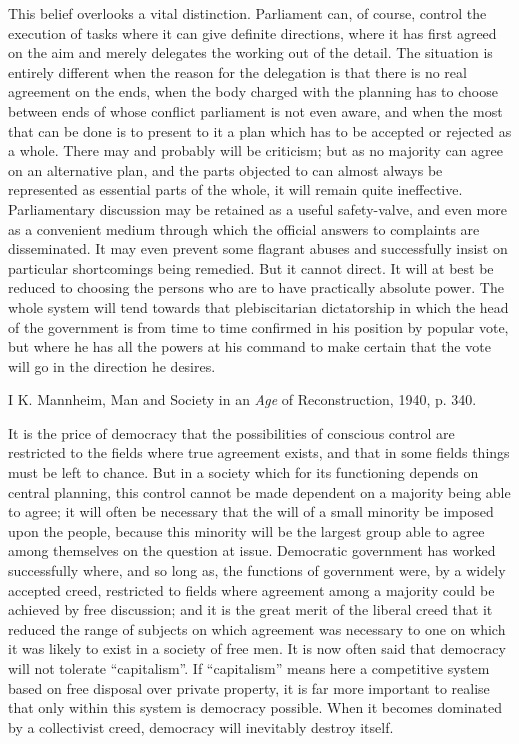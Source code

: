 \documentclass[11pt,openany]{book}
\begin{document}
This belief overlooks a vital distinction. Parliament can, of course, control the execution of tasks where it can give definite directions, where it has first agreed on the aim and merely delegates the working out of the detail. The situation is entirely different when the reason for the delegation is that there is no real agreement on the ends, when the body charged with the planning has to choose between ends of whose conflict parliament is not even aware, and when the most that can be done is to present to it a plan which has to be accepted or rejected as a whole. There may and probably will be criticism; but as no majority can agree on an alternative plan, and the parts objected to can almost always be represented as essential parts of the whole, it will remain quite ineffective. Parliamentary discussion may be retained as a useful safety-valve, and even more as a convenient medium through which the official answers to complaints are disseminated. It may even prevent some flagrant abuses and successfully insist on particular shortcomings being remedied. But it cannot direct. It will at best be reduced to choosing the persons who are to have practically absolute power. The whole system will tend towards that plebiscitarian dictatorship in which the head of the government is from time to time confirmed in his position by popular vote, but where he has all the powers at his command to make certain that the vote will go in the direction he desires.

I K. Mannheim, Man and Society in an \emph{Age} of Reconstruction, 1940, p. 340.

It is the price of democracy that the possibilities of conscious control are restricted to the fields where true agreement exists, and that in some fields things must be left to chance. But in a society which for its functioning depends on central planning, this control cannot be made dependent on a majority being able to agree; it will often be necessary that the will of a small minority be imposed upon the people, because this minority will be the largest group able to agree among themselves on the question at issue. Democratic government has worked successfully where, and so long as, the functions of government were, by a widely accepted creed, restricted to fields where agreement among a majority could be achieved by free discussion; and it is the great merit of the liberal creed that it reduced the range of subjects on which agreement was necessary to one on which it was likely to exist in a society of free men. It is now often said that democracy will not tolerate ``capitalism''. If ``capitalism'' means here a competitive system based on free disposal over private property, it is far more important to realise that only within this system is democracy possible. When it becomes dominated by a collectivist creed, democracy will inevitably destroy itself.
\end{document}
